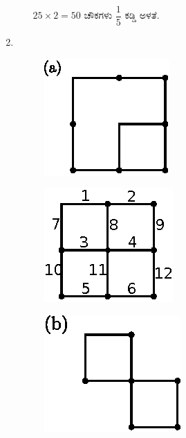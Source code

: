 \begin{enumerate}
\begin{itemize}
\begin{minipage}[c]{4cm}
$25\times 2 = 50$ ಚೌಕಗಳು $\dfrac{1}{5}$ ಕಡ್ಡಿ ಅಳತೆ. 
\end{minipage}
\end{itemize}

\eject

\item 
~

\begin{minipage}[c]{4cm}
\begin{figure}[H]
\centering
\includegraphics{images/chap7/ans12.eps}

\end{figure}
\end{minipage}
\begin{minipage}[c]{5cm}
\begin{figure}[H]
\centering
\includegraphics{images/chap7/ans12a.eps}

\end{figure}
\end{minipage}


\begin{minipage}[c]{4cm}
\begin{figure}[H]
\centering
\includegraphics{images/chap7/ans12b.eps}


\end{figure}
\end{minipage}
\end{enumerate}
